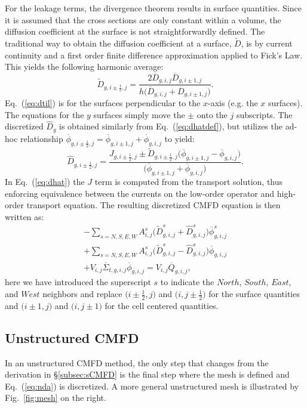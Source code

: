 \documentclass{anstrans}
\renewcommand{\bar}[1]{\overline{#1}} %
\newcommand{\half}{\frac{1}{2}}
\renewcommand{\eqref}[1]{Eq.~(\ref{#1})}
\newcommand{\figref}[1]{Fig.~\ref{#1}}
\begin{document}
For the leakage terms, the divergence theorem results in surface quantities. Since it is assumed that the cross sections are only constant within a volume, the diffusion coefficient at the surface is not straightforwardly defined. The traditional way to obtain the diffusion coefficient at a surface, $\tilde D$, is by current continuity and a first order finite difference approximation applied to Fick's Law. This yields the following harmonic average:
\begin{equation} \label{eq:dtil}
    \tilde D_{g,i\pm\half,j} = \frac{2\bar D_{g,i,j} \bar D_{g,i\pm1,j}}
        {h \Big(\bar D_{g,i,j} + \bar D_{g,i\pm1,j}\Big)} .
\end{equation}
\noindent \eqref{eq:dtil} is for the surfaces perpendicular to the $x$-axis (e.g. the $x$ surfaces). The equations for the $y$ surfaces simply move the $\pm$ onto the $j$ subscripts. The discretized $\hat D_{g}$ is obtained similarly from \eqref{eq:dhatdef}, but utilizes the ad-hoc relationship $\bar\phi_{g,i\pm\half,j} = \bar\phi_{g,i\pm1,j} + \bar\phi_{g,i,j}$ to yield:
\begin{equation} \label{eq:dhat}
    \hat D_{g,i\pm\half,j} = \frac{J_{g,i\pm\half,j} 
         \pm \tilde D_{g,i\pm\half,j}\Big(\bar\phi_{g,i\pm1,j}-\bar\phi_{g,i,j}\Big)}
        {\Big(\bar\phi_{g,i\pm1,j}+\bar\phi_{g,i,j}\Big)} .
\end{equation}
\noindent In \eqref{eq:dhat} the $J$ term is computed from the transport solution, thus enforcing equivalence between the currents on the low-order operator and high-order transport equation.
The resulting discretized CMFD equation is then written as:
\begin{multline} \label{eq:sCMFD}
    - \sum_{s=N,S,E,W} A_{i,j}^{s}\bigg(\tilde D_{g,i,j}^s + \hat D_{g,i,j}^s\bigg) \bar{\phi}_{g,i,j}^s \\
    + \sum_{s=N,S,E,W} A_{i,j}^{s}\bigg(\tilde D_{g,i,j}^s - \hat D_{g,i,j}^s\bigg) \bar\phi_{g,i,j} \\
    + V_{i,j}\bar\Sigma_{t,g,i,j}\bar\phi_{g,i,j} = V_{i,j} \bar Q_{g,i,j} ,
\end{multline}
\noindent here we have introduced the superscript $s$ to indicate the $North$, $South$, $East$, and $West$ neighbors and replace $\Big(i\pm\half,j\Big)$ and $\Big(i,j\pm\half\Big)$ for the surface quantities and $\Big(i\pm1,j\Big)$ and $\Big(i,j\pm1\Big)$ for the cell centered quantities.

\subsection{Unstructured CMFD}
In an unstructured CMFD method, the only step that changes from the derivation in \S\ref{subsec:sCMFD} is the final step where the mesh is defined and \eqref{eq:nda} is discretized. A more general unstructured mesh is illustrated by \figref{fig:mesh} on the right.
\end{document}
